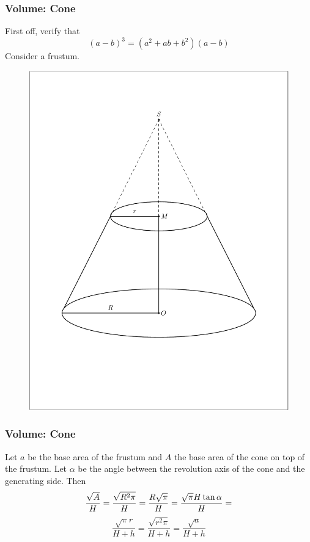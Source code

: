 \documentclass[xcolor=dvipsnames]{beamer}
\begin{document}
\begin{frame}
  \frametitle{Volume: Cone}
  First off, verify that
  \begin{equation}
    \label{eq:oeveezee}
    (a-b)^{3}=(a^{2}+ab+b^{2})(a-b)
  \end{equation}
Consider a frustum. 
  \begin{figure}[h]
    \includegraphics[scale=.5]{./frustum.pdf}
  \end{figure}
\end{frame}

\begin{frame}
  \frametitle{Volume: Cone}
Let $a$ be the base area of the frustum and $A$ the base area of the
cone on top of the frustum. Let $\alpha$ be the angle between the
revolution axis of the cone and the generating side. Then
\begin{equation}
  \label{eq:aroowiej}
  \frac{\sqrt{A}}{H}=\frac{\sqrt{R^{2}\pi}}{H}=\frac{R\sqrt{\pi}}{H}=\frac{\sqrt{\pi}H\tan\alpha}{H}=\notag
\end{equation}
\begin{equation}
  \label{eq:hopeexee}
  \frac{\sqrt{\pi}r}{H+h}=\frac{\sqrt{r^{2}\pi}}{H+h}=\frac{\sqrt{a}}{H+h}
\end{equation}
\end{frame}
\end{document}
